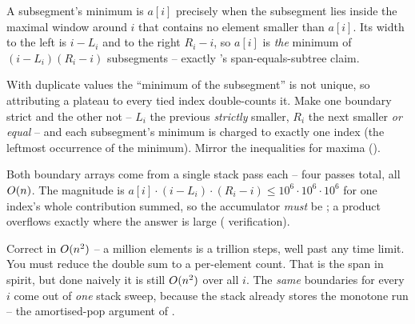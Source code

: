 \begin{observation}
A subsegment's minimum is $a[i]$ precisely when the subsegment lies inside the maximal window around $i$
that contains no element smaller than $a[i]$. Its width to the left is $i-L_i$ and to the right $R_i-i$,
so $a[i]$ is \emph{the} minimum of $(i-L_i)(R_i-i)$ subsegments -- exactly 's
span-equals-subtree claim.
\end{observation}
\begin{observation}
With duplicate values the ``minimum of the subsegment'' is not unique, so attributing a plateau to every
tied index double-counts it. Make one boundary strict and the other not -- $L_i$ the previous
\emph{strictly} smaller, $R_i$ the next smaller \emph{or equal} -- and each subsegment's minimum is charged
to exactly one index (the leftmost occurrence of the minimum). Mirror the inequalities for maxima
().
\end{observation}
\begin{observation}
Both boundary arrays come from a single stack pass each -- four passes total, all $O(n)$. The magnitude
is $a[i]\cdot(i-L_i)\cdot(R_i-i)\le 10^{6}\cdot 10^{6}\cdot 10^{6}$ for one index's whole contribution
summed, so the accumulator \emph{must} be ; a  product overflows exactly where the
answer is large ( verification).
\end{observation}

\begin{thinkbox}
{Correct in $O(n^2)$ -- a million elements is a trillion steps, well past any time limit. You must
reduce the double sum to a per-element count.}
{That is the span in spirit, but done naively it is still $O(n^2)$ over all $i$. The \emph{same}
boundaries for every $i$ come out of \emph{one} stack sweep, because the stack already stores the monotone
run -- the amortised-pop argument of .}
\end{thinkbox}


